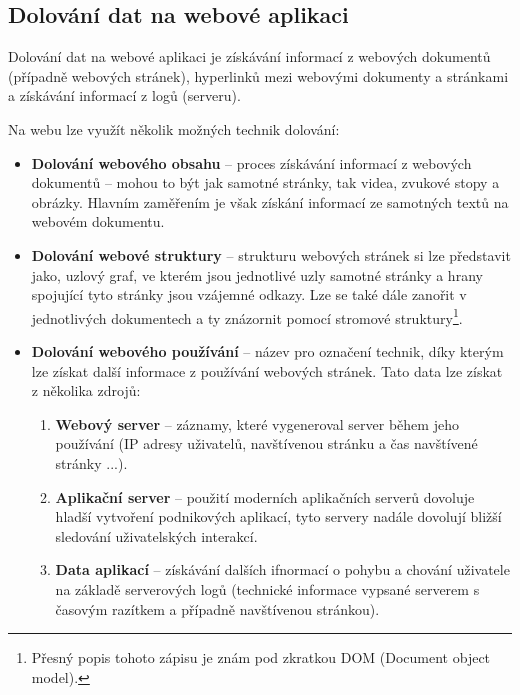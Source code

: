 \subsection{Dolování dat na webové aplikaci}
\par Dolování dat na webové aplikaci je získávání informací z webových dokumentů (případně webových stránek), hyperlinků mezi webovými dokumenty a stránkami a získávání informací z logů (serveru).

\par Na webu lze využít několik možných technik dolování:
\begin{itemize}
\item \textbf{Dolování webového obsahu} -- proces získávání informací z webových dokumentů -- mohou to být jak samotné stránky, tak videa, zvukové stopy a obrázky. Hlavním zaměřením je však získání informací ze samotných textů na webovém dokumentu.
\item \textbf{Dolování webové struktury} -- strukturu webových stránek si lze představit jako, uzlový graf, ve kterém jsou jednotlivé uzly samotné stránky a hrany spojující tyto stránky jsou vzájemné odkazy. Lze se také dále zanořit v jednotlivých dokumentech a ty znázornit pomocí stromové struktury\footnote{Přesný popis tohoto zápisu je znám pod zkratkou DOM (Document object model).}.
\item \textbf{Dolování webového používání} -- název pro označení technik, díky kterým lze získat další informace z používání webových stránek. Tato data lze získat z několika zdrojů:
\begin{enumerate}
  \item \textbf{Webový server} -- záznamy, které vygeneroval server během jeho používání (IP adresy uživatelů, navštívenou stránku a čas navštívené stránky ...).
  \item \textbf{Aplikační server} -- použití moderních aplikačních serverů dovoluje hladší vytvoření podnikových aplikací, tyto servery nadále dovolují bližší sledování uživatelských interakcí.
  \item \textbf{Data aplikací} --  získávání dalších ifnormací o pohybu a chování uživatele na základě serverových logů (technické informace vypsané serverem s časovým razítkem a případně navštívenou stránkou). \cite{minigbook}
\end{enumerate}
\end{itemize}

